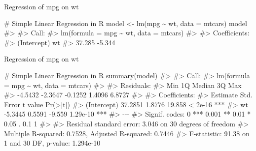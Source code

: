 \documentclass[
  18 pt,
  ignorenonframetext,
  aspectratio=1610,
]{beamer}
\newenvironment{Shaded}{\begin{snugshade}}{\end{snugshade}}
\newcommand{\AttributeTok}[1]{\textcolor[rgb]{0.40,0.45,0.13}{#1}}
\newcommand{\CommentTok}[1]{\textcolor[rgb]{0.37,0.37,0.37}{#1}}
\newcommand{\FunctionTok}[1]{\textcolor[rgb]{0.28,0.35,0.67}{#1}}
\newcommand{\NormalTok}[1]{\textcolor[rgb]{0.00,0.23,0.31}{#1}}
\newcommand{\OtherTok}[1]{\textcolor[rgb]{0.00,0.23,0.31}{#1}}
\newcommand{\SpecialCharTok}[1]{\textcolor[rgb]{0.37,0.37,0.37}{#1}}
\begin{document}
\begin{frame}[fragile]{Regression of mpg on wt}
\protect\hypertarget{regression-of-mpg-on-wt}{}
\begin{Shaded}
\begin{Highlighting}[]
\CommentTok{\# Simple Linear Regression in R}
\NormalTok{model }\OtherTok{\textless{}{-}} \FunctionTok{lm}\NormalTok{(mpg }\SpecialCharTok{\textasciitilde{}}\NormalTok{ wt, }\AttributeTok{data =}\NormalTok{ mtcars)}
\NormalTok{model}
\CommentTok{\#\textgreater{} }
\CommentTok{\#\textgreater{} Call:}
\CommentTok{\#\textgreater{} lm(formula = mpg \textasciitilde{} wt, data = mtcars)}
\CommentTok{\#\textgreater{} }
\CommentTok{\#\textgreater{} Coefficients:}
\CommentTok{\#\textgreater{} (Intercept)           wt  }
\CommentTok{\#\textgreater{}      37.285       {-}5.344}
\end{Highlighting}
\end{Shaded}

\normalsize
\end{frame}

\begin{frame}[fragile]{Regression of mpg on wt}
\protect\hypertarget{regression-of-mpg-on-wt-1}{}
\tiny

\begin{Shaded}
\begin{Highlighting}[]
\CommentTok{\# Simple Linear Regression in R}
\FunctionTok{summary}\NormalTok{(model)}
\CommentTok{\#\textgreater{} }
\CommentTok{\#\textgreater{} Call:}
\CommentTok{\#\textgreater{} lm(formula = mpg \textasciitilde{} wt, data = mtcars)}
\CommentTok{\#\textgreater{} }
\CommentTok{\#\textgreater{} Residuals:}
\CommentTok{\#\textgreater{}     Min      1Q  Median      3Q     Max }
\CommentTok{\#\textgreater{} {-}4.5432 {-}2.3647 {-}0.1252  1.4096  6.8727 }
\CommentTok{\#\textgreater{} }
\CommentTok{\#\textgreater{} Coefficients:}
\CommentTok{\#\textgreater{}             Estimate Std. Error t value Pr(\textgreater{}|t|)    }
\CommentTok{\#\textgreater{} (Intercept)  37.2851     1.8776  19.858  \textless{} 2e{-}16 ***}
\CommentTok{\#\textgreater{} wt           {-}5.3445     0.5591  {-}9.559 1.29e{-}10 ***}
\CommentTok{\#\textgreater{} {-}{-}{-}}
\CommentTok{\#\textgreater{} Signif. codes:  0 \textquotesingle{}***\textquotesingle{} 0.001 \textquotesingle{}**\textquotesingle{} 0.01 \textquotesingle{}*\textquotesingle{} 0.05 \textquotesingle{}.\textquotesingle{} 0.1 \textquotesingle{} \textquotesingle{} 1}
\CommentTok{\#\textgreater{} }
\CommentTok{\#\textgreater{} Residual standard error: 3.046 on 30 degrees of freedom}
\CommentTok{\#\textgreater{} Multiple R{-}squared:  0.7528, Adjusted R{-}squared:  0.7446 }
\CommentTok{\#\textgreater{} F{-}statistic: 91.38 on 1 and 30 DF,  p{-}value: 1.294e{-}10}
\end{Highlighting}
\end{Shaded}

\normalsize
\end{frame}
\end{document}
